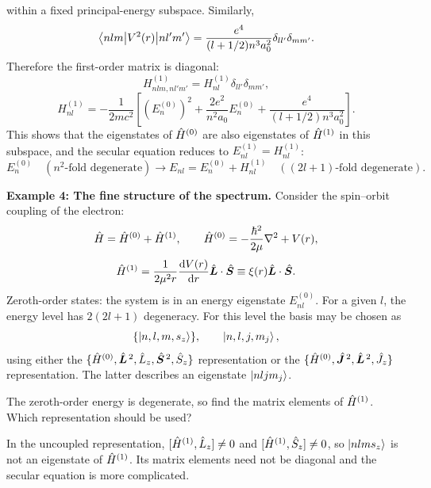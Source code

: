 within a fixed principal-energy subspace. Similarly,
\begin{equation}
 \left\langle nlm\middle|V^2(r)\middle|nl'm'\right\rangle
 =\frac{e^4}{(l+1/2)n^3a_0^2}\delta_{ll'}\delta_{mm'}.
\end{equation}
Therefore the first-order matrix is diagonal:
\begin{equation}
 H_{nlm,nl'm'}^{(1)}=H_{nl}^{(1)}\delta_{ll'}\delta_{mm'},
\end{equation}
\begin{equation}
 H_{nl}^{(1)}=-\frac{1}{2mc^2}
 \left[(E_n^{(0)})^2+\frac{2e^2}{n^2a_0}E_n^{(0)}
 +\frac{e^4}{(l+1/2)n^3a_0^2}\right].
\end{equation}
This shows that the eigenstates of $\hat{H}^{(0)}$ are also eigenstates of $\hat{H}^{(1)}$ in this subspace, and the secular equation reduces to $E_{nl}^{(1)}=H_{nl}^{(1)}$:
\begin{equation}
 E_n^{(0)}\quad(n^2\text{-fold degenerate})
 \longrightarrow E_{nl}=E_n^{(0)}+H_{nl}^{(1)}
 \quad((2l+1)\text{-fold degenerate}).
\end{equation}

\textbf{Example 4: The fine structure of the spectrum.}
Consider the spin--orbit coupling of the electron:
\begin{equation}
 \hat{H}=\hat{H}^{(0)}+\hat{H}^{(1)},\qquad
 \hat{H}^{(0)}=-\frac{\hbar^2}{2\mu}\nabla^2+V(r),
\end{equation}
\begin{equation}
 \hat{H}^{(1)}=\frac{1}{2\mu^2r}\frac{\mathrm{d} V(r)}{\mathrm{d} r}
 \hat{\bm{L}}\cdot\hat{\bm{S}}
 \equiv\xi(r)\hat{\bm{L}}\cdot\hat{\bm{S}}.
\end{equation}
Zeroth-order states: the system is in an energy eigenstate $E_{nl}^{(0)}$. For a given $l$, the energy level has $2(2l+1)$ degeneracy. For this level the basis may be chosen as
\begin{equation}
 \{\left|n,l,m,s_z\right\rangle\},\qquad
 \left|n,l,j,m_j\right\rangle,
\end{equation}
using either the $\{\hat{H}^{(0)},\hat{\bm{L}}^{\,2},\hat{L}_z,
 \hat{\bm{S}}^{\,2},\hat{S}_z\}$ representation or the
$\{\hat{H}^{(0)},\hat{\bm{J}}^{\,2},\hat{\bm{L}}^{\,2},\hat{J}_z\}$ representation. The latter describes an eigenstate $\left|nljm_j\right\rangle$.

The zeroth-order energy is degenerate, so find the matrix elements of $\hat{H}^{(1)}$. Which representation should be used?

In the uncoupled representation, $[\hat{H}^{(1)},\hat{L}_z]\ne0$ and $[\hat{H}^{(1)},\hat{S}_z]\ne0$, so $\left|nlms_z\right\rangle$ is not an eigenstate of $\hat{H}^{(1)}$. Its matrix elements need not be diagonal and the secular equation is more complicated.

